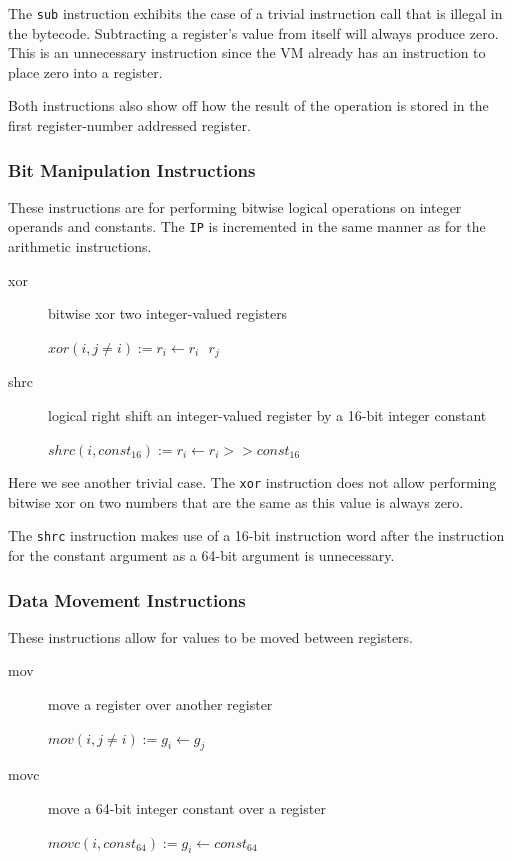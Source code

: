 \documentclass[english,a4paper]{article}
\begin{document}
The \verb|sub| instruction exhibits the case of a trivial instruction call that is illegal in the bytecode. Subtracting a register's value from itself will always produce zero. This is an unnecessary instruction since the VM already has an instruction to place zero into a register.

Both instructions also show off how the result of the operation is stored in the first register-number addressed register.

\subsubsection{Bit Manipulation Instructions}

These instructions are for performing bitwise logical operations on
integer operands and constants. The \verb|IP| is incremented in the
same manner as for the arithmetic instructions.

\begin{description}
	\item[xor] bitwise xor two integer-valued registers
	
	$xor(i, j \neq i) := r _{i} \longleftarrow  r _{i} \textbf{ \^{} 
	} r _{j} $ \\
	
	\item[shrc] logical right shift an integer-valued register by a 
	16-bit
	integer constant
	
	$shrc(i, const _{16}) :=  r _{i} \longleftarrow  r _{i} >> const 
	_{16} $ \\	
\end{description}

Here we see another trivial case. The \verb|xor| instruction does not allow performing bitwise xor on two numbers that are the same as this value is always zero.

The \verb|shrc| instruction makes use of a 16-bit instruction word after the instruction for the constant argument as a 64-bit argument is unnecessary. 

\subsubsection{Data Movement Instructions}
These instructions allow for values to be moved between registers.

\begin{description}
	\item[mov] move a register over another register
	
	$mov(i, j \neq i) := g_{i} \longleftarrow g_{j} $ \\
	\item[movc] move a 64-bit integer constant over a register
	
	$movc(i, const_{64}):= g_{i} \longleftarrow const_{64} $ \\
\end{description}
\end{document}
